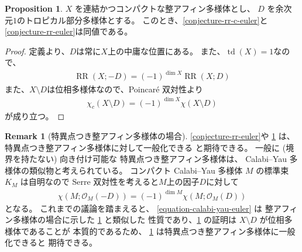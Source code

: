 \documentclass[a4paper,dvipdfmx,reqno,12pt]{amsart}
\theoremstyle{definition}
\newtheorem{proposition}[theorem]{Proposition}
\newtheorem{remark}[theorem]{Remark}
\newcommand{\opn}[1]{\operatorname{#1}}
\numberwithin{equation}{section}
\begin{document}
\begin{proposition}
\label{proposition-divisor-poincare}
$X$ を連結かつコンパクトな整アフィン多様体とし、
$D$ を余次元$1$のトロピカル部分多様体とする。
このとき、\cref{conjecture-rr-c-euler}と
\cref{conjecture-rr-euler}は同値である。
\end{proposition}
\begin{proof}
定義より、$D$は常に$X$上の中庸な位置にある。
また、$\opn{td}(X)=1$なので、
\begin{align}
\opn{RR}(X;-D)=(-1)^{\dim X}\opn{RR}(X;D)
\end{align}
また、$X\setminus D$は位相多様体なので、Poincar\'e 双対性より
\begin{align}
\chi_c(X\setminus D)=(-1)^{\dim X}\chi(X\setminus D)
\end{align}
が成り立つ。
\end{proof}

\begin{remark}[{特異点つき整アフィン多様体の場合}]
\label{remark-iass}
\cref{conjecture-rr-euler}や
\cref{proposition-divisor-poincare}
は、特異点つき整アフィン多様体に対して一般化できる
と期待できる。
一般に (境界を持たない) 向き付け可能な
特異点つき整アフィン多様体は、
Calabi--Yau 多様体の類似物と考えられている。
コンパクト Calabi--Yau 多様体 $M$ の標準束
$K_M$ は自明なので
Serre 双対性を考えると$M$上の因子$D$に対して
\begin{align}
\label{equation-calabi-yau-euler}
\chi(M;\mathcal{O}_M(-D))=(-1)^{\dim M}
\chi(M;\mathcal{O}_{M}(D))
\end{align}
となる。
これまでの議論を踏まえると、
\cref{equation-calabi-yau-euler} は
整アフィン多様体の場合に示した
\cref{proposition-divisor-poincare} と類似した
性質であり、\cref{proposition-divisor-poincare}
の証明は $X\setminus D$ が位相多様体であることが
本質的であるため、
\cref{proposition-divisor-poincare}
は特異点つき整アフィン多様体に一般化できると
期待できる。
\end{remark}
\end{document}
